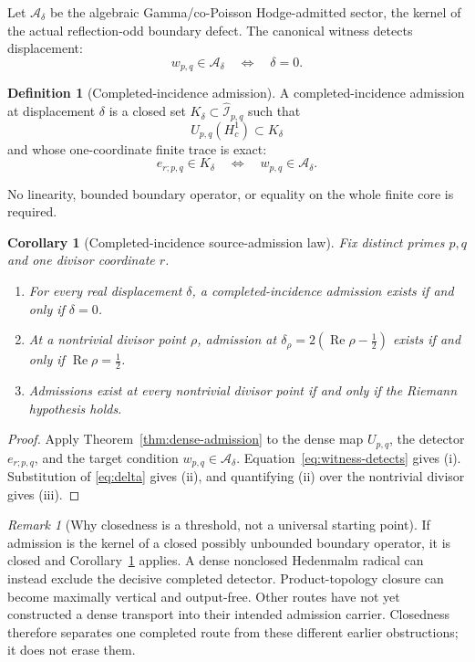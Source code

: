 \documentclass[11pt]{article}
\newtheorem{corollary}[theorem]{Corollary}
\theoremstyle{definition}
\newtheorem{definition}[theorem]{Definition}
\theoremstyle{remark}
\newtheorem{remark}[theorem]{Remark}
\newcommand{\cA}{\mathcal A}
\newcommand{\cI}{\mathcal I}
\newcommand{\Rea}{\operatorname{Re}}
\begin{document}
Let \(\cA_\delta\) be the algebraic Gamma/co-Poisson Hodge-admitted
sector, the kernel of the actual reflection-odd boundary defect.  The
canonical witness detects displacement:
\[
                       w_{p,q}\in\cA_\delta
                       \quad\Longleftrightarrow\quad
                       \delta=0.
\tag{5.8}\label{eq:witness-detects}
\]

\begin{definition}[Completed-incidence admission]
\label{def:admission}
A completed-incidence admission at displacement \(\delta\) is a closed
set \(K_\delta\subset\widehat{\cI}_{p,q}\) such that
\[
 U_{p,q}(H^1_{\!c})\subset K_\delta
\tag{5.9}\label{eq:source-landing}
\]
and whose one-coordinate finite trace is exact:
\[
 e_{r;p,q}\in K_\delta
 \quad\Longleftrightarrow\quad
 w_{p,q}\in\cA_\delta.
\tag{5.10}\label{eq:finite-trace}
\]
\end{definition}

No linearity, bounded boundary operator, or equality on the whole finite
core is required.

\begin{corollary}[Completed-incidence source-admission law]
\label{thm:xi-admission}
Fix distinct primes \(p,q\) and one divisor coordinate \(r\).
\begin{enumerate}[label=\textup{(\roman*)},leftmargin=2.2em]
\item For every real displacement \(\delta\), a completed-incidence
      admission exists if and only if \(\delta=0\).
\item At a nontrivial divisor point \(\rho\), admission at
      \(\delta_\rho=2(\Rea\rho-\tfrac12)\) exists if and only if
      \(\Rea\rho=\tfrac12\).
\item Admissions exist at every nontrivial divisor point if and only if
      the Riemann hypothesis holds.
\end{enumerate}
\end{corollary}

\begin{proof}
Apply Theorem~\ref{thm:dense-admission} to the dense map \(U_{p,q}\), the
detector \(e_{r;p,q}\), and the target condition
\(w_{p,q}\in\cA_\delta\).  Equation~\eqref{eq:witness-detects} gives
(i).  Substitution of \eqref{eq:delta} gives (ii), and quantifying (ii)
over the nontrivial divisor gives (iii).
\end{proof}

\begin{remark}[Why closedness is a threshold, not a universal starting point]
If admission is the kernel of a closed possibly unbounded boundary
operator, it is closed and Corollary~\ref{thm:xi-admission} applies.  A
dense nonclosed Hedenmalm radical can instead exclude the decisive
completed detector.  Product-topology closure can become maximally
vertical and output-free.  Other routes have not yet constructed a dense
transport into their intended admission carrier.  Closedness therefore
separates one completed route from these different earlier obstructions;
it does not erase them.
\end{remark}
\end{document}
